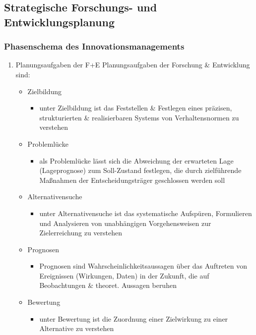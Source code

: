\documentclass[11pt]{article}
\begin{document}
\subsection{Strategische Forschungs- und Entwicklungsplanung}
\label{sec:orgfbe4a9b}
\subsubsection{Phasenschema des Innovationsmanagements}
\label{sec:org51ea9e5}
\begin{enumerate}
\item Planungsaufgaben der F+E
\label{sec:org18efd97}
Planungsaufgaben der Forschung \& Entwicklung sind:
\begin{itemize}
\item Zielbildung
\begin{itemize}
\item unter Zielbildung ist das Feststellen \& Festlegen eines präzisen, strukturierten \& realisierbaren Systems von Verhaltensnormen zu verstehen
\end{itemize}
\item Problemlücke
\begin{itemize}
\item als Problemlücke lässt sich die Abweichung der erwarteten Lage (Lageprognose) zum Soll-Zustand festlegen, die durch zielführende Maßnahmen der Entscheidungsträger geschlossen werden soll
\end{itemize}
\item Alternativensuche
\begin{itemize}
\item unter Alternativensuche ist das systematische Aufspüren, Formulieren und Analysieren von unabhängigen Vorgehensweisen zur Zielerreichung zu verstehen
\end{itemize}
\item Prognosen
\begin{itemize}
\item Prognosen sind Wahrscheinlichkeitsaussagen über das Auftreten von Ereignissen (Wirkungen, Daten) in der Zukunft, die auf Beobachtungen \& theoret. Aussagen beruhen
\end{itemize}
\item Bewertung
\begin{itemize}
\item unter Bewertung ist die Zuordnung einer Zielwirkung zu einer Alternative zu verstehen
\end{itemize}
\end{itemize}



\end{enumerate}
\end{document}
